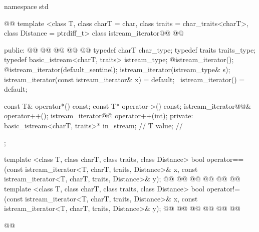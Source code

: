 \begin{codeblock}
namespace std { @@
  template <class T, class charT = char, class traits = char_traits<charT>,
      class Distance = ptrdiff_t>
  class istream_iterator@\removed{:}@
    @@ {
  public:
    @@
    @@
    @@
    @@
    @@
    typedef charT char_type;
    typedef traits traits_type;
    typedef basic_istream<charT, traits> istream_type;
    @\seebelow@ istream_iterator();
    @\seebelow@ istream_iterator(default_sentinel);
    istream_iterator(istream_type& s);
    istream_iterator(const istream_iterator& x) = default;
   ~istream_iterator() = default;

    const T& operator*() const;
    const T* operator->() const;
    istream_iterator@@& operator++();
    istream_iterator@@  operator++(int);
  private:
    basic_istream<charT, traits>* in_stream; // \expos
    T value;                                 // \expos
  };

  template <class T, class charT, class traits, class Distance>
    bool operator==(const istream_iterator<T, charT, traits, Distance>& x,
            const istream_iterator<T, charT, traits, Distance>& y);
  @@
    @@
            @@
  @@
    @@
            @@
  template <class T, class charT, class traits, class Distance>
    bool operator!=(const istream_iterator<T, charT, traits, Distance>& x,
            const istream_iterator<T, charT, traits, Distance>& y);
  @@
    @@
            @@
  @@
    @@
            @@
}@\added{\}\}\}\}}@
\end{codeblock}

